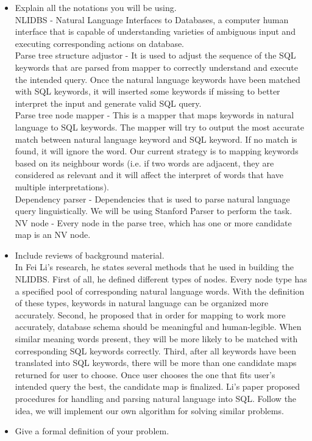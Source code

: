 \documentclass[twocolumn]{article}
\begin{document}
\begin{itemize}
	\itemsep0em
	\item Explain all the notations you will be using.\\
	
	NLIDBS - Natural Language Interfaces to Databases, a computer human interface that is capable of understanding varieties of ambiguous input and executing corresponding actions on database.\\
	Parse tree structure adjustor - It is used to adjust the sequence of the SQL keywords that are parsed from mapper to correctly understand and execute the intended query.  Once the natural language keywords have been matched with SQL keywords, it will inserted some keywords if missing to better interpret the input and  generate valid SQL query.\\
	Parse tree node mapper - This is a mapper that maps keywords in natural language to SQL keywords. The mapper will try to output the most accurate match between natural language keyword and SQL keyword. If no match is found, it will ignore the word. Our current strategy is to mapping keywords based on its neighbour words (i.e. if two words are adjacent, they are considered as relevant and it will affect the interpret of words that have multiple interpretations).\\
	Dependency parser - Dependencies that is used to parse natural language query linguistically.  We will be using Stanford Parser to perform the task.\\
	NV node - Every node in the parse tree, which has one or more candidate map is an NV node.\\
	\item Include reviews of background material.\\
	
	In Fei Li’s research, he states several methods that he used in building the NLIDBS. First of all, he defined different types of nodes. Every node type has a specified pool of corresponding natural language words. With the definition of these types, keywords in natural language can be organized more accurately. Second, he proposed that in order for mapping to work more accurately, database schema should be meaningful and human-legible. When similar meaning words present, they will be more likely to be matched with corresponding SQL keywords correctly. Third, after all keywords have been translated into SQL keywords, there will be more than one candidate maps returned for user to choose. Once user chooses the one that fits user’s intended query the best, the candidate map is finalized. Li’s paper proposed procedures for handling and parsing natural language into SQL.\cite{li2014} Follow the idea, we will implement our own algorithm for solving similar problems.\\
	\item Give a formal definition of your problem.\\
	

\end{itemize}
\end{document}
